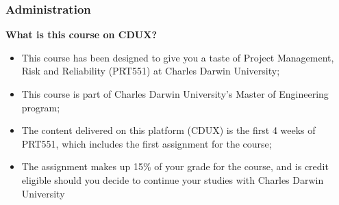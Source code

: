 \documentclass{beamer}
\begin{document}



\begin{frame}
\frametitle{Administration}
\textbf{What is this course on CDUX?}
\begin{itemize}
\item This course has been designed to give you a taste of Project Management, Risk and Reliability (PRT551) at Charles Darwin University;
\item This course is part of Charles Darwin University's Master of Engineering program;
\item The content delivered on this platform (CDUX) is the first 4 weeks of PRT551, which includes the first assignment for the course;
\item The assignment makes up 15\% of your grade for the course, and is credit eligible should you decide to continue your studies with Charles Darwin University 
\end{itemize}
\end{frame}
\end{document}
